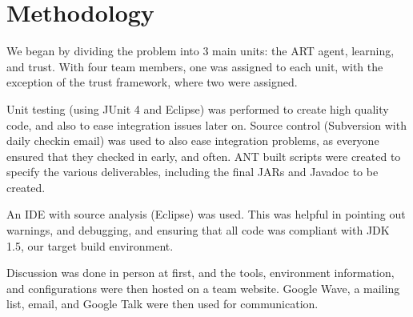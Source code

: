 \section{Methodology}
We began by dividing the problem into 3 main units: the ART agent, learning,
and trust.  With four team members, one was assigned to each unit, with the
exception of the trust framework, where two were assigned.

Unit testing (using JUnit 4 and Eclipse) was performed to create high quality
code, and also to ease integration issues later on.  Source control (Subversion
with daily checkin email) was used to also ease integration problems, as
everyone ensured that they checked in early, and often.  ANT built scripts were
created to specify the various deliverables, including the final JARs and
Javadoc to be created.

An IDE with source analysis (Eclipse) was used.  This was helpful in pointing
out warnings, and debugging, and ensuring that all code was compliant with JDK
1.5, our target build environment.
    
Discussion was done in person at first, and the tools, environment
information, and configurations were then hosted on a team website. Google Wave,
a mailing list, email, and Google Talk were then used for communication.